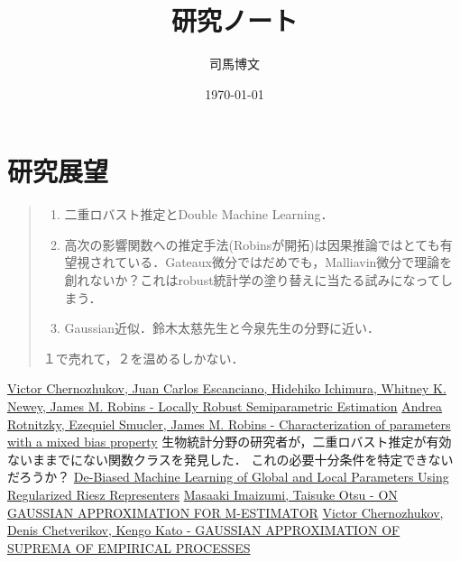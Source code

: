 \documentclass[uplatex,dvipdfmx]{jsreport}
\title{研究ノート}
\author{司馬博文}
\date{\today}
\begin{document}
\tableofcontents

\chapter{研究展望}

\begin{quotation}
    \begin{enumerate}
        \item 二重ロバスト推定とDouble Machine Learning．
        \item 高次の影響関数への推定手法(Robinsが開拓)は因果推論ではとても有望視されている．Gateaux微分ではだめでも，Malliavin微分で理論を創れないか？これはrobust統計学の塗り替えに当たる試みになってしまう．
        \item Gaussian近似．鈴木太慈先生と今泉先生の分野に近い．
    \end{enumerate}
    １で売れて，２を温めるしかない．
\end{quotation}

\begin{thebibliography}{99}
    \href{https://arxiv.org/abs/1608.00033}{Victor Chernozhukov, Juan Carlos Escanciano, Hidehiko Ichimura, Whitney K. Newey, James M. Robins - Locally Robust Semiparametric Estimation}
    \href{https://arxiv.org/abs/1904.03725}{Andrea Rotnitzky, Ezequiel Smucler, James M. Robins - Characterization of parameters with a mixed bias property}
    生物統計分野の研究者が，二重ロバスト推定が有効ないままでにない関数クラスを発見した．
    これの必要十分条件を特定できないだろうか？
    \href{https://arxiv.org/abs/1802.08667}{De-Biased Machine Learning of Global and Local Parameters Using Regularized Riesz Representers}
    \href{https://arxiv.org/abs/2012.15678}{Masaaki Imaizumi, Taisuke Otsu - ON GAUSSIAN APPROXIMATION FOR M-ESTIMATOR}
    \href{https://arxiv.org/abs/1212.6885}{Victor Chernozhukov, Denis Chetverikov, Kengo Kato - GAUSSIAN APPROXIMATION OF SUPREMA OF EMPIRICAL PROCESSES}
\end{thebibliography}
\end{document}
